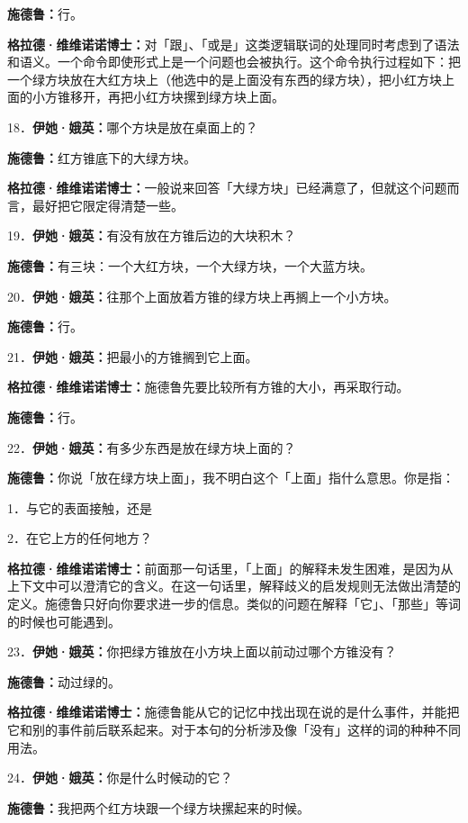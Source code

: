 \documentclass[
  12pt,
  twoside,
  openright,
  oldfontcommands,
]{memoir}
\newcommand{\dialogname}[1]{{\heifamily\bfseries #1}}
\begin{document}
\dialogname{施德鲁：}行。

\dialogname{格拉德·维维诺诺博士：}对「跟」、「或是」这类逻辑联词的处理同时考虑到了语法和语义。一个命令即使形式上是一个问题也会被执行。这个命令执行过程如下：把一个绿方块放在大红方块上（他选中的是上面没有东西的绿方块），把小红方块上面的小方锥移开，再把小红方块摞到绿方块上面。

18．\dialogname{伊她·娥英：}哪个方块是放在桌面上的？

\dialogname{施德鲁：}红方锥底下的大绿方块。

\dialogname{格拉德·维维诺诺博士：}一般说来回答「大绿方块」已经满意了，但就这个问题而言，最好把它限定得清楚一些。

19．\dialogname{伊她·娥英：}有没有放在方锥后边的大块积木？

\dialogname{施德鲁：}有三块：一个大红方块，一个大绿方块，一个大蓝方块。

20．\dialogname{伊她·娥英：}往那个上面放着方锥的绿方块上再搁上一个小方块。

\dialogname{施德鲁：}行。

21．\dialogname{伊她·娥英：}把最小的方锥搁到它上面。

\dialogname{格拉德·维维诺诺博士：}施德鲁先要比较所有方锥的大小，再采取行动。

\dialogname{施德鲁：}行。

22．\dialogname{伊她·娥英：}有多少东西是放在绿方块上面的？

\dialogname{施德鲁：}你说「放在绿方块上面」，我不明白这个「上面」指什么意思。你是指：

1．与它的表面接触，还是

2．在它上方的任何地方？

\dialogname{格拉德·维维诺诺博士：}前面那一句话里，「上面」的解释未发生困难，是因为从上下文中可以澄清它的含义。在这一句话里，解释歧义的启发规则无法做出清楚的定义。施德鲁只好向你要求进一步的信息。类似的问题在解释「它」、「那些」等词的时候也可能遇到。

23．\dialogname{伊她·娥英：}你把绿方锥放在小方块上面以前动过哪个方锥没有？

\dialogname{施德鲁：}动过绿的。

\dialogname{格拉德·维维诺诺博士：}施德鲁能从它的记忆中找出现在说的是什么事件，并能把它和别的事件前后联系起来。对于本句的分析涉及像「没有」这样的词的种种不同用法。

24．\dialogname{伊她·娥英：}你是什么时候动的它？

\dialogname{施德鲁：}我把两个红方块跟一个绿方块摞起来的时候。
\end{document}
